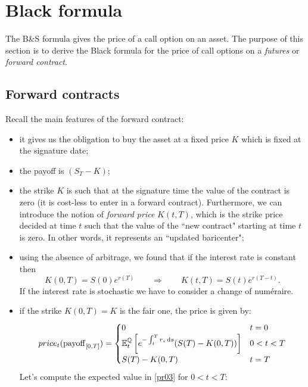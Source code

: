 \section{Black formula}
The B\&S formula gives the price of a call option on an asset. The purpose of this section is to derive the Black formula for the price of call options on a \emph{futures} or \emph{forward contract}.\\

\subsection{Forward contracts} %
Recall the main features of the forward contract:
\begin{itemize}
    \item it gives us the obligation to buy the asset at a fixed price $K$ which is fixed at the signature date;
    \item the payoff is $(S_T-K)$;
    \item the strike $K$ is such that at the signature time the value of the contract is zero (it is cost-less to enter in a forward contract). Furthermore, we can introduce the notion of \emph{forward price} $K(t,T)$, which is the strike price decided at time $t$ such that the value of the ``new contract" starting at time $t$ is zero. In other words, it represents an ``updated baricenter";
    \item using the absence of arbitrage, we found that if the interest rate is constant then
    \begin{equation}
        K(0,T) = S(0)e^{r(T)} \qquad\Rightarrow\qquad K(t,T) = S(t)e^{r(T-t)}.
    \end{equation}
    If the interest rate is stochastic we have to consider a change of numéraire.
    \item if the strike $K(0,T)=K$ is the fair one, the price is given by:
    \begin{equation}\label{pr03}
        price_t(\operatorname{payoff}_{[0,T]}) =
        \begin{cases}
        0 & t=0 \\
        \mathbb{E}^{\mathbb{Q}}_t\left[e^{-\int_t^T r_s\,\dd s}(S(T)-K(0,T))\right] & 0<t<T \\
        S(T)-K(0,T) & t=T
        \end{cases}
    \end{equation}
    Let's compute the expected value in \eqref{pr03} for $0<t<T$:
    \begin{align*}

\end{align*}
\end{itemize}
